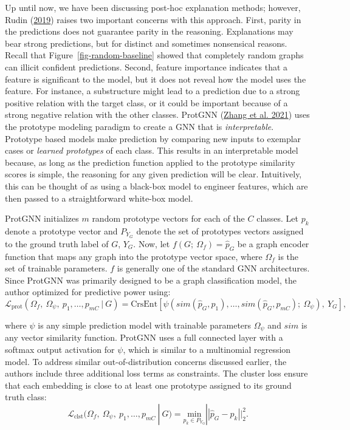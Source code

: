 \documentclass[
  11pt,
  letterpaper,
]{article}
\begin{document}
\quad Up until now, we have been discussing post-hoc explanation
methods; however, Rudin (\protect\hyperlink{ref-Rudin_2019}{2019})
raises two important concerns with this approach. First, parity in the
predictions does not guarantee parity in the reasoning. Explanations may
bear strong predictions, but for distinct and sometimes nonsensical
reasons. Recall that Figure~\ref{fig-random-baseline} showed that
completely random graphs can illicit confident predictions. Second,
feature importance indicates that a feature is significant to the model,
but it does not reveal how the model uses the feature. For instance, a
substructure might lead to a prediction due to a strong positive
relation with the target class, or it could be important because of a
strong negative relation with the other classes. ProtGNN
(\protect\hyperlink{ref-Zhang_Liu_Wang_Lu_Lee_2021}{Zhang et al. 2021})
uses the prototype modeling paradigm to create a GNN that is
\emph{interpretable}. Prototype based models make prediction by
comparing new inputs to exemplar cases or \emph{learned prototypes} of
each class. This results in an interpretable model because, as long as
the prediction function applied to the prototype similarity scores is
simple, the reasoning for any given prediction will be clear.
Intuitively, this can be thought of as using a black-box model to
engineer features, which are then passed to a straightforward white-box
model.

\quad ProtGNN initializes \(m\) random prototype vectors for each of the
\(C\) classes. Let \(p_k\) denote a prototype vector and \(P_{Y_G}\)
denote the set of prototypes vectors assigned to the ground truth label
of \(G\), \(Y_G\). Now, let \(f(G; \ \Omega_f) = \hat p_G\) be a graph
encoder function that maps any graph into the prototype vector space,
where \(\Omega_f\) is the set of trainable parameters. \(f\) is
generally one of the standard GNN architectures. Since ProtGNN was
primarily designed to be a graph classification model, the author
optimized for predictive power using:\\
\begin{equation}
    \mathcal{L}_{\text{prot}}(\Omega_f, \ \Omega_\psi, \ p_1, \dots, p_{mC} \ | \ G)= \text{CrsEnt} \left[\psi \left(sim\left(\hat p_G, p_1\right), \dots, sim\left(\hat p_G, p_{mC}\right); \ \Omega_\psi\right), \ Y_G \right], 
\end{equation}

where \(\psi\) is any simple prediction model with trainable parameters
\(\Omega_\psi\) and \(sim\) is any vector similarity function. ProtGNN
uses a full connected layer with a softmax output activation for
\(\psi\), which is similar to a multinomial regression model. To address
similar out-of-distribution concerns discussed earlier, the authors
include three additional loss terms as constraints. The cluster loss
ensure that each embedding is close to at least one prototype assigned
to its ground truth class:\\
\begin{equation}
    \mathcal{L}_{\text{clst}}(\Omega_f, \ \Omega_\psi, \ p_1, \dots, p_{mC} \ | \ G) = \underset{p_k \in P_{Y_G}}{\text{min}} || \hat p_G - p_k ||^2_2. 
\end{equation}
\end{document}

